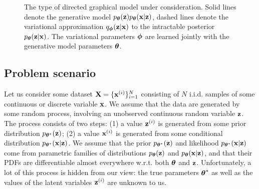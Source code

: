 \documentclass{article} %
\theoremstyle{definition}
\begin{document}
\begin{figure}[t]
\begin{center}
\end{center}
\caption{
The type of directed graphical model under consideration. Solid lines denote the generative model $p_{\boldsymbol{\theta}}(\mathbf{z})p_{\boldsymbol{\theta}}(\mathbf{x}|\mathbf{z})$, dashed lines denote the variational approximation $q_{\boldsymbol{\phi}}(\mathbf{z}|\mathbf{x})$ to the intractable posterior $p_{\boldsymbol{\theta}}(\mathbf{z}|\mathbf{x})$. The variational parameters $\boldsymbol{\phi}$ are learned jointly with the generative model parameters $\boldsymbol{\theta}$.
}
\end{figure}

\subsection{Problem scenario}
\label{sec:problem}
%
%
%

Let us consider some dataset $\mathbf{X} = \{\mathbf{x}^{(i)}\}_{i=1}^N$ consisting of $N$ i.i.d. samples of some continuous or discrete variable $\mathbf{x}$. We assume that the data are generated by some random process, involving an unobserved continuous random variable $\mathbf{z}$. The process consists of two steps: (1) a value $\mathbf{z}^{(i)}$ is generated from some prior distribution $p_{\boldsymbol{\theta}^*}(\mathbf{z})$; (2) a value $\mathbf{x}^{(i)}$ is generated from some conditional distribution $p_{\boldsymbol{\theta}^*}(\mathbf{x}|\mathbf{z})$.  We assume that the prior $p_{\boldsymbol{\theta}^*}(\mathbf{z})$ and likelihood $p_{\boldsymbol{\theta}^*}(\mathbf{x}|\mathbf{z})$ come from parametric families of distributions $p_{\boldsymbol{\theta}}(\mathbf{z})$ and $p_{\boldsymbol{\theta}}(\mathbf{x}|\mathbf{z})$, and that their PDFs are differentiable almost everywhere w.r.t. both $\boldsymbol{\theta}$ and $\mathbf{z}$. Unfortunately, a lot of this process is hidden from our view: the true parameters $\boldsymbol{\theta}^*$ as well as the values of the latent variables $\mathbf{z}^{(i)}$ are unknown to us.  
\end{document}
